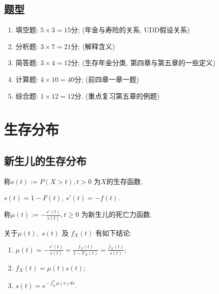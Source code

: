 \documentclass[lang=cn,10pt]{elegantbook}
\begin{document}
\section*{题型}
\begin{enumerate}
    \item 填空题: $5\times 3 = 15$分; (年金与寿险的关系, UDD假设关系)
    \item 分析题: $3\times 7 = 21$分; (解释含义)
    \item 简答题: $3\times 4 = 12$分; (生存年金分类, 第四章与第五章的一些定义)
    \item 计算题: $4\times 10 = 40$分; (前四章一章一题)
    \item 综合题: $1\times 12 = 12$分. (重点复习第五章的例题)
\end{enumerate}

\chapter{生存分布}

\section{新生儿的生存分布}

\begin{definition}[生存函数]
    称$s(t):=P(X>t),t>0$ 为$X$的生存函数.
\end{definition}

\begin{corollary}
    $s(t)=1-F(t)$, $s'(t)=-f(t)$.
\end{corollary}

\begin{definition}[死亡力函数]
    称$\mu(t):=-\frac{s'(t)}{s(t)},t\ge 0$ 为新生儿的死亡力函数.
\end{definition}

\begin{corollary} 关于$\mu(t),$ $s(t)$ 及 $f_X(t)$ 有如下结论:
    \begin{enumerate}
        \item $\mu(t)=-\frac{s'(t)}{s(t)}=\frac{f_X(t)}{1-F_X(t)}=\frac{f_X(t)}{s(t)};$
        \item $f_X(t)=\mu(t)s(t);$
        \item $s(t)=e^{-\int_0^t\mu(s)ds}.$
    \end{enumerate}
\end{corollary}
\end{document}
